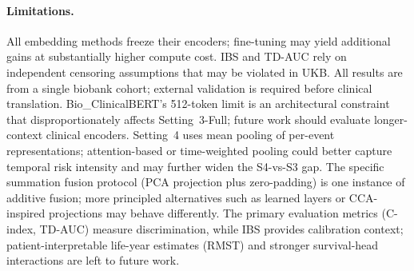 \paragraph{Limitations.}
All embedding methods freeze their encoders; fine-tuning may yield
additional gains at substantially higher compute cost.
IBS and TD-AUC rely on independent censoring assumptions that may be
violated in UKB.
All results are from a single biobank cohort; external validation is
required before clinical translation.
Bio\_ClinicalBERT's 512-token limit is an architectural constraint that
disproportionately affects Setting~3-Full; future work should evaluate
longer-context clinical encoders.
Setting~4 uses mean pooling of per-event representations; attention-based
or time-weighted pooling could better capture temporal risk intensity and
may further widen the S4-vs-S3 gap.
The specific summation fusion protocol (PCA projection plus zero-padding)
is one instance of additive fusion; more principled alternatives such as
learned layers or CCA-inspired projections may behave differently.
The primary evaluation metrics (C-index, TD-AUC) measure discrimination,
while IBS provides calibration context; patient-interpretable life-year
estimates (RMST) and stronger survival-head interactions are left to future
work.

